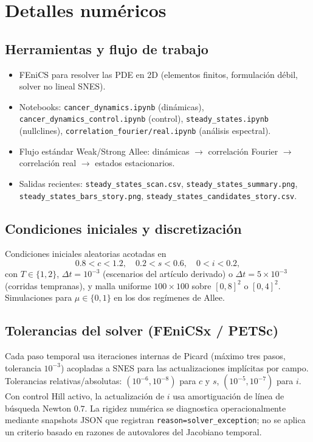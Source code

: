 \chapter{Detalles numéricos}

\section{Herramientas y flujo de trabajo}
\begin{itemize}
  \item FEniCS para resolver las PDE en 2D (elementos finitos, formulación débil, solver no lineal SNES).
  \item Notebooks: \texttt{cancer\_dynamics.ipynb} (dinámicas), \texttt{cancer\_dynamics\_control.ipynb} (control), \texttt{steady\_states.ipynb} (nullclines), \texttt{correlation\_fourier/real.ipynb} (análisis espectral).
  \item Flujo estándar Weak/Strong Allee: dinámicas $\rightarrow$ correlación Fourier $\rightarrow$ correlación real $\rightarrow$ estados estacionarios.
  \item Salidas recientes: \texttt{steady\_states\_scan.csv}, \texttt{steady\_states\_summary.png}, \texttt{steady\_states\_bars\_story.png}, \texttt{steady\_states\_candidates\_story.csv}.
\end{itemize}

\section{Condiciones iniciales y discretización}
Condiciones iniciales aleatorias acotadas en
\[
0.8 < c < 1.2, \quad 0.2 < s < 0.6, \quad 0 < i < 0.2,
\]
con $T\in\{1,2\}$, $\Delta t=10^{-3}$ (escenarios del artículo derivado) o $\Delta t=5\times10^{-3}$ (corridas tempranas), y malla uniforme $100\times100$ sobre $[0,8]^2$ o $[0,4]^2$. Simulaciones para $\mu\in\{0,1\}$ en los dos regímenes de Allee.

\section{Tolerancias del solver (FEniCSx / PETSc)}
Cada paso temporal usa iteraciones internas de Picard (máximo tres pasos, tolerancia $10^{-3}$) acopladas a SNES para las actualizaciones implícitas por campo. Tolerancias relativas/absolutas: $(10^{-6},10^{-8})$ para $c$ y $s$, $(10^{-5},10^{-7})$ para $i$. Con control Hill activo, la actualización de $i$ usa amortiguación de línea de búsqueda Newton $0.7$. La rigidez numérica se diagnostica operacionalmente mediante snapshots JSON que registran \texttt{reason=solver\_exception}; no se aplica un criterio basado en razones de autovalores del Jacobiano temporal.

